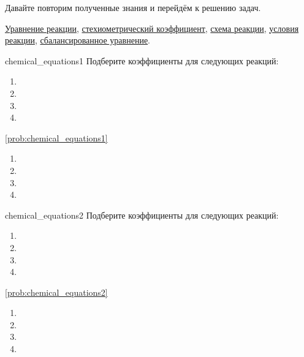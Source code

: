 Давайте повторим полученные знания и перейдём к решению задач.

\begin{termlist}
    \hyperref[term:chemical_equation]{Уравнение реакции},
    \hyperref[term:stoichiometric_coefficient]{стехиометрический коэффициент},
    \hyperref[term:reaction_scheme]{схема реакции},
    \hyperref[sec:reaction_conditions]{условия реакции},
    \hyperref[term:stoichiometrically_balanced_equation]{сбалансированное уравнение}.
\end{termlist}

\begin{problem}{}{chemical_equations1}
    Подберите коэффициенты для следующих реакций:
    \begin{enumerate}[label=\arabic*)]
        \item {}
        \item {}
        \item {}
        \item {}
    \end{enumerate}
    \begin{sol}{\ref{prob:chemical_equations1}}
        \begin{enumerate}[label=\arabic*)]
            \item {}
            \item {}
            \item {}
            \item {}
        \end{enumerate}
    \end{sol}
\end{problem}

\begin{problem}{}{chemical_equations2}
    Подберите коэффициенты для следующих реакций:
    \begin{enumerate}[label=\arabic*)]
        \item {}
        \item {}
        \item {}
        \item {}
    \end{enumerate}
    \begin{sol}{\ref{prob:chemical_equations2}}
        \begin{enumerate}[label=\arabic*)]
            \item {}
            \item {}
            \item {}
            \item {}
        \end{enumerate}
    \end{sol}
\end{problem}

